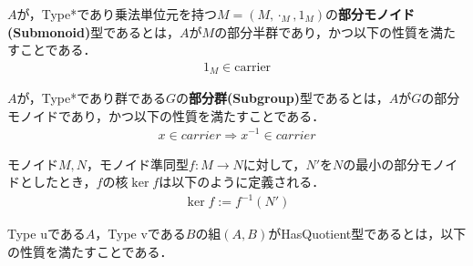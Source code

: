 \begin{definition}
    $A$が，Type*であり乗法単位元を持つ$M=(M,\cdot_M,1_M)$の\textbf{部分モノイド(Submonoid)}型であるとは，$A$が$M$の部分半群であり，かつ以下の性質を満たすことである．
    \begin{align}
        1_M \in \text{carrier}
    \end{align}
\end{definition}

\begin{definition}
    $A$が，Type*であり群である$G$の\textbf{部分群(Subgroup)}型であるとは，$A$が$G$の部分モノイドであり，かつ以下の性質を満たすことである．
    \begin{align}
        x \in carrier \Rightarrow x^{-1} \in carrier
    \end{align}
\end{definition}



\begin{definition}
    モノイド$M,N$，モノイド準同型$f : M \rightarrow N$に対して，$N'$を$N$の最小の部分モノイドとしたとき，$f$の核$\ker f$は以下のように定義される．
    \begin{align}
        \ker f := f^{-1}(N')
    \end{align}
\end{definition}

%
%
\begin{definition}
    Type uである$A$，Type vである$B$の組$(A,B)$がHasQuotient型であるとは，以下の性質を満たすことである．

\end{definition}

